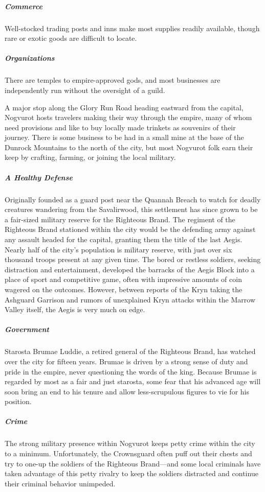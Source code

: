 \documentclass[10pt,a4paper,twoside,bg=print,twocolumn,openany,nodeprecatedcode]{dndbook}
\begin{document}
\subparagraph{Commerce}
Well-stocked trading posts and inns make most supplies readily available, though rare or exotic goods are difficult to locate.

\subparagraph{Organizations}
There are temples to empire-approved gods, and most businesses are independently run without the oversight of a guild.

A major stop along the Glory Run Road heading eastward from the capital, Nogvurot hosts travelers making their way through the empire, many of whom need provisions and like to buy locally made trinkets as souvenirs of their journey. There is some business to be had in a small mine at the base of the Dunrock Mountains to the north of the city, but most Nogvurot folk earn their keep by crafting, farming, or joining the local military.

\subparagraph{A Healthy Defense}
Originally founded as a guard post near the Quannah Breach to watch for deadly creatures wandering from the Savalirwood, this settlement has since grown to be a fair-sized military reserve for the Righteous Brand. The regiment of the Righteous Brand stationed within the city would be the defending army against any assault headed for the capital, granting them the title of the last Aegis. Nearly half of the city's population is military reserve, with just over six thousand troops present at any given time. The bored or restless soldiers, seeking distraction and entertainment, developed the barracks of the Aegis Block into a place of sport and competitive game, often with impressive amounts of coin wagered on the outcomes. However, between reports of the Kryn taking the Ashguard Garrison and rumors of unexplained Kryn attacks within the Marrow Valley itself, the Aegis is very much on edge.

\subparagraph{Government}
Starosta Brumae Luddie, a retired general of the Righteous Brand, has watched over the city for fifteen years. Brumae is driven by a strong sense of duty and pride in the empire, never questioning the words of the king. Because Brumae is regarded by most as a fair and just starosta, some fear that his advanced age will soon bring an end to his tenure and allow less-scrupulous figures to vie for his position.

\subparagraph{Crime}
The strong military presence within Nogvurot keeps petty crime within the city to a minimum. Unfortunately, the Crownsguard often puff out their chests and try to one-up the soldiers of the Righteous Brand—and some local criminals have taken advantage of this petty rivalry to keep the soldiers distracted and continue their criminal behavior unimpeded.
\end{document}
